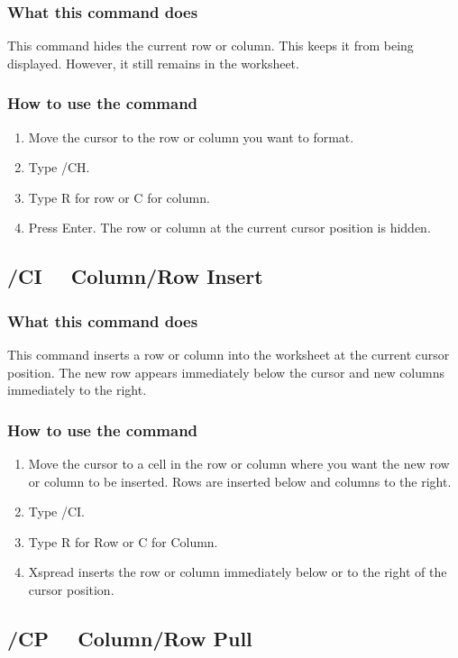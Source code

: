 \subsubsection*{What this command does}
This command hides the current row or column.  This keeps it from 
being displayed.  However, it still remains in the worksheet.

\subsubsection*{How to use the command}
\begin{enumerate}
\item{Move the cursor to the row or column you want to format.}
\item{Type /CH.}
\item{Type R for row or C for column.}
\item{Press Enter.  The row or column at the current cursor position is
hidden.}
\end{enumerate}

\subsection*{/CI \ \ Column/Row Insert}

\subsubsection*{What this command does}
This command inserts a row or column into the worksheet at the current 
cursor position.  The new row appears immediately below the cursor and 
new columns immediately to the right.

\subsubsection*{How to use the command}
\begin{enumerate}
\item{Move the cursor to a cell in the row or column where you want the
new row or column to be inserted.  Rows are inserted below and 
columns to the right.}
\item{Type /CI.}
\item{Type R for Row or C for Column.}
\item{Xspread inserts the row or column immediately below or to the
right of the cursor position.}
\end{enumerate}


\subsection*{/CP \ \     Column/Row Pull}

